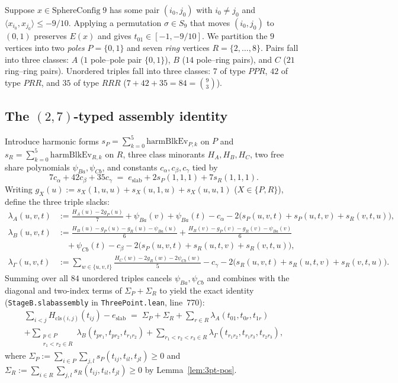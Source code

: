 \documentclass[11pt,reqno]{amsart}
\renewcommand{\_}{\origunderscore\allowbreak}
\theoremstyle{definition}
\newcommand{\ip}[2]{\langle #1, #2 \rangle}
\begin{document}
Suppose $x \in \mathrm{SphereConfig}\;9$ has some pair $(i_0, j_0)$ with $i_0 \ne j_0$ and $\ip{x_{i_0}}{x_{j_0}} \le -9/10$.
Applying a permutation $\sigma \in S_9$ that moves $(i_0, j_0)$ to $(0,1)$ preserves $E(x)$ and gives $t_{01} \in [-1, -9/10]$.
We partition the $9$ vertices into two \emph{poles} $P = \{0,1\}$ and seven \emph{ring} vertices $R = \{2,\dots,8\}$.
Pairs fall into three classes: $A$ ($1$ pole--pole pair $\{0,1\}$), $B$ ($14$ pole--ring pairs), and $C$ ($21$ ring--ring pairs).
Unordered triples fall into three classes: $7$ of type $PPR$, $42$ of type $PRR$, and $35$ of type $RRR$ ($7 + 42 + 35 = 84 = \binom{9}{3}$).

\subsection{The $(2,7)$-typed assembly identity}\label{subsec:slab-assembly}
Introduce harmonic forms $s_P = \sum_{k=0}^5 \mathrm{harmBlkEv}_{P,k}$ on $P$ and $s_R = \sum_{k=0}^5 \mathrm{harmBlkEv}_{R,k}$ on $R$, three class minorants $H_A, H_B, H_C$, two free share polynomials $\psi_{Ba}, \psi_{Cb}$, and constants $c_\alpha, c_\beta, c_\gamma$ tied by
\[
  7 c_\alpha + 42 c_\beta + 35 c_\gamma \;=\; e_{\mathrm{slab}} + 2 s_P(1,1,1) + 7 s_R(1,1,1).
\]
Writing $g_X(u) := s_X(1,u,u) + s_X(u,1,u) + s_X(u,u,1)$ ($X \in \{P,R\}$), define the three triple slacks:
\begin{align*}
  \lambda_A(u,v,t) &:= \frac{H_A(u) - 2 g_P(u)}{7} + \psi_{Ba}(v) + \psi_{Ba}(t) - c_\alpha - 2\bigl(s_P(u,v,t) + s_P(u,t,v) + s_R(v,t,u)\bigr), \\
  \lambda_B(u,v,t) &:= \frac{H_B(u) - g_P(u) - g_R(u) - \psi_{Ba}(u)}{6} + \frac{H_B(v) - g_P(v) - g_R(v) - \psi_{Ba}(v)}{6} \\
                   &\quad + \psi_{Cb}(t) - c_\beta - 2\bigl(s_P(u,v,t) + s_R(u,t,v) + s_R(v,t,u)\bigr), \\
  \lambda_\Gamma(u,v,t) &:= \sum_{w \in \{u,v,t\}} \frac{H_C(w) - 2 g_R(w) - 2\psi_{Cb}(w)}{5} - c_\gamma - 2\bigl(s_R(u,v,t) + s_R(u,t,v) + s_R(v,t,u)\bigr).
\end{align*}
Summing over all $84$ unordered triples cancels $\psi_{Ba}, \psi_{Cb}$ and combines with the diagonal and two-index terms of $\Sigma_P + \Sigma_R$ to yield the exact identity (\texttt{StageB.slab\_assembly\_9} in \texttt{ThreePoint.lean}, line~770):
\begin{multline}\label{eq:slab-id}
  \sum_{i<j} H_{\mathrm{cls}(i,j)}(t_{ij}) - e_{\mathrm{slab}}
  \;=\; \Sigma_P + \Sigma_R + \sum_{r \in R} \lambda_A(t_{01}, t_{0r}, t_{1r}) \\
  + \sum_{\substack{p \in P \\ r_1 < r_2 \in R}} \lambda_B(t_{pr_1}, t_{pr_2}, t_{r_1 r_2})
  + \sum_{r_1 < r_2 < r_3 \in R} \lambda_\Gamma(t_{r_1 r_2}, t_{r_1 r_3}, t_{r_2 r_3}),
\end{multline}
where $\Sigma_P := \sum_{i \in P}\sum_{j,l} s_P(t_{ij}, t_{il}, t_{jl}) \ge 0$ and $\Sigma_R := \sum_{i \in R}\sum_{j,l} s_R(t_{ij}, t_{il}, t_{jl}) \ge 0$ by Lemma~\ref{lem:3pt-pos}.
\end{document}
